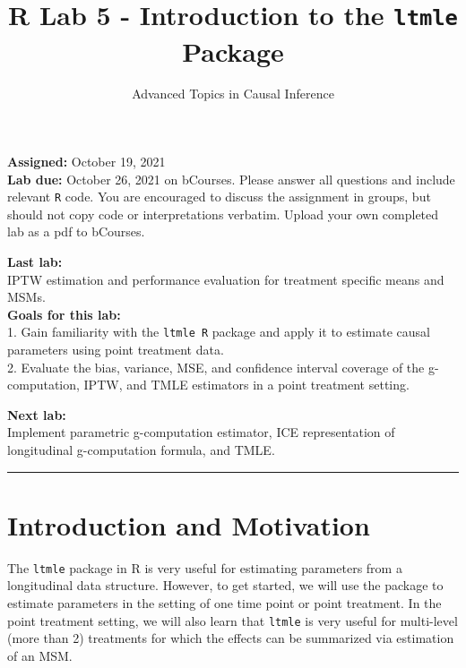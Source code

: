 \documentclass[answers]{exam}
\title{R Lab 5 - Introduction to the \texttt{ltmle} Package}
\author{Advanced Topics in Causal Inference}
\date{}
\begin{document}
\maketitle



\maketitle
\noindent \textbf{Assigned:} October 19, 2021\\
\textbf{Lab due:} October 26, 2021 on bCourses. Please answer all questions and include relevant \texttt{R} code. You are encouraged to discuss the assignment in groups, but should not copy code or interpretations verbatim. Upload your own completed lab as a pdf to bCourses.



\noindent \textbf{Last lab:} \\ 
IPTW estimation and performance evaluation for treatment specific means and MSMs.\\


\noindent \textbf{Goals for this lab:} \\
1. Gain familiarity with the \texttt{ltmle R} package and apply it to estimate causal parameters using point treatment data.\\
2. Evaluate the bias, variance, MSE, and confidence interval coverage of the g-computation, IPTW, and TMLE estimators in a point treatment setting.


\noindent \textbf{Next lab:}\\
Implement parametric g-computation estimator, ICE representation of longitudinal g-computation formula, and TMLE.

\begin{center}
\noindent\rule{18cm}{0.4pt}
\end{center}

\section{Introduction and Motivation}

The \texttt{ltmle} package in R is very useful for estimating parameters from a longitudinal data structure. However, to get started, we will use the package to estimate parameters in the setting of one time point or point treatment. In the point treatment setting, we will also learn that \texttt{ltmle} is very useful for multi-level (more than 2) treatments  for which the effects can be summarized via estimation of an MSM.
\end{document}
